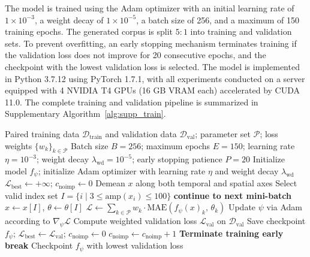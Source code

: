 \documentclass[11pt]{article}
\begin{document}
The model is trained using the Adam optimizer with an initial learning rate of $1 \times 10^{-3}$, a weight decay of $1 \times 10^{-5}$, a batch size of 256, and a maximum of 150 training epochs. The generated corpus is split $5{:}1$ into training and validation sets. To prevent overfitting, an early stopping mechanism terminates training if the validation loss does not improve for 20 consecutive epochs, and the checkpoint with the lowest validation loss is selected. The model is implemented in Python 3.7.12 using PyTorch 1.7.1, with all experiments conducted on a server equipped with 4 NVIDIA T4 GPUs (16 GB VRAM each) accelerated by CUDA 11.0. The complete training and validation pipeline is summarized in Supplementary Algorithm~\ref{alg:supp_train}.

\begin{algorithm}[H]
\caption{Training and Validation Procedure for EEG-to-Parameter Inversion}
\label{alg:supp_train}
\begin{algorithmic}[1]
\Require Paired training data $\mathcal{D}_{\mathrm{train}}$ and validation data $\mathcal{D}_{\mathrm{val}}$; parameter set $\mathcal{P}$; loss weights $\{w_k\}_{k\in\mathcal{P}}$
\Require Batch size $B=256$; maximum epochs $E=150$; learning rate $\eta=10^{-3}$; weight decay $\lambda_{\mathrm{wd}}=10^{-5}$; early stopping patience $P=20$
\State Initialize model $f_\psi$; initialize Adam optimizer with learning rate $\eta$ and weight decay $\lambda_{\mathrm{wd}}$
\State $\mathcal{L}_{\mathrm{best}} \leftarrow +\infty$; $c_{\mathrm{noimp}} \leftarrow 0$
        \State Demean $x$ along both temporal and spatial axes
        \State Select valid index set $I = \{i \mid 3 \leq \mathrm{amp}(x_i) \leq 100\}$
         \State \textbf{continue to next mini-batch} \EndIf
        \State $x \leftarrow x[I]$, $\theta \leftarrow \theta[I]$
        \State $\mathcal{L} \leftarrow \displaystyle\sum_{k\in\mathcal{P}} w_k \cdot \mathrm{MAE}(f_\psi(x)_k,\,\theta_k)$
        \State Update $\psi$ via Adam according to $\nabla_\psi \mathcal{L}$
    \EndFor
    \State Compute weighted validation loss $\mathcal{L}_{\mathrm{val}}$ on $\mathcal{D}_{\mathrm{val}}$
        \State Save checkpoint $f_\psi$; $\mathcal{L}_{\mathrm{best}} \leftarrow \mathcal{L}_{\mathrm{val}}$; $c_{\mathrm{noimp}} \leftarrow 0$
    \Else
        \State $c_{\mathrm{noimp}} \leftarrow c_{\mathrm{noimp}} + 1$
            \State \textbf{Terminate training early}
            \State \textbf{break}
        \EndIf
    \EndIf
\EndFor
\State \Return Checkpoint $f_\psi$ with lowest validation loss
\end{algorithmic}
\end{algorithm}
\end{document}

